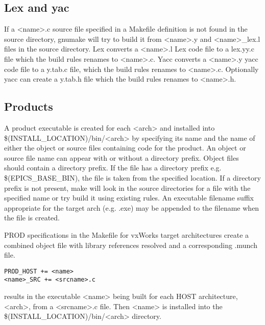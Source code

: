 \subsection{Lex and yac}

If a \textless{}name\textgreater{}.c source file specified in a Makefile definition is not found in the source directory, gnumake will try to build 
it from \textless{}name\textgreater{}.y and \textless{}name\textgreater{}\_lex.l files in the source directory. Lex converts a \textless{}name\textgreater{}.l Lex code file to a lex.yy.c file 
which the build rules renames to \textless{}name\textgreater{}.c. Yacc converts a \textless{}name\textgreater{}.y yacc code file to a y.tab.c file, which the build 
rules renames to \textless{}name\textgreater{}.c. Optionally yacc can create a y.tab.h file which the build rules renames to \textless{}name\textgreater{}.h.

\subsection{Products}

A product executable is created for each \textless{}arch\textgreater{} and installed into \$(INSTALL\_LOCATION)/bin/\textless{}arch\textgreater{} by specifying its 
name and the name of either the object or source files containing code for the product. An object or source file name can 
appear with or without a directory prefix. Object files should contain a directory prefix. If the file has a directory prefix 
e.g. \$(EPICS\_BASE\_BIN), the file is taken from the specified location. If a directory prefix is not present, make will look 
in the source directories for a file with the specified name or try build it using existing rules. An executable filename 
suffix appropriate for the target arch (e.g. .exe) may be appended to the filename when the file is created.

PROD specifications in the Makefile for vxWorks target architectures create a combined object file with library 
references resolved and a corresponding .munch file.

\begin{verbatim}PROD_HOST += <name>
<name>_SRC += <srcname>.c
\end{verbatim}results in the executable \textless{}name\textgreater{} being built for each HOST architecture,  \textless{}arch\textgreater{}, from a \textless{}srcname\textgreater{}.c file. Then \textless{}name\textgreater{} 
is installed into the \$(INSTALL\_LOCATION)/bin/\textless{}arch\textgreater{} directory. 

